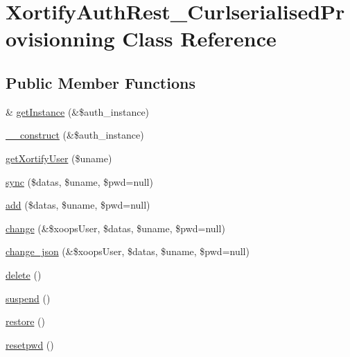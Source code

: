 \hypertarget{class_xortify_auth_rest___curlserialised_provisionning}{\section{Xortify\-Auth\-Rest\-\_\-\-Curlserialised\-Provisionning Class Reference}
\label{class_xortify_auth_rest___curlserialised_provisionning}
}
\subsection*{Public Member Functions}
\begin{DoxyCompactItemize}
\item 
\& \hyperlink{class_xortify_auth_rest___curlserialised_provisionning_a2c8eaa915c70d75289ac8a03686194f9}{get\-Instance} (\&\$auth\-\_\-instance)
\item 
\hyperlink{class_xortify_auth_rest___curlserialised_provisionning_a0f25832dc86774e7605b81fe57b083c2}{\-\_\-\-\_\-construct} (\&\$auth\-\_\-instance)
\item 
\hyperlink{class_xortify_auth_rest___curlserialised_provisionning_a041d726ac26672547ed1504e8e0117aa}{get\-Xortify\-User} (\$uname)
\item 
\hyperlink{class_xortify_auth_rest___curlserialised_provisionning_a35dc08b0f2138eb818ff95345b73bcff}{sync} (\$datas, \$uname, \$pwd=null)
\item 
\hyperlink{class_xortify_auth_rest___curlserialised_provisionning_adfc9fcef01e7bd7b2f47e8e79d51fc63}{add} (\$datas, \$uname, \$pwd=null)
\item 
\hyperlink{class_xortify_auth_rest___curlserialised_provisionning_ae1f0971b9712c794620cf309164e43af}{change} (\&\$xoops\-User, \$datas, \$uname, \$pwd=null)
\item 
\hyperlink{class_xortify_auth_rest___curlserialised_provisionning_a94f4e0408f26e65abca347ec883f4ec9}{change\-\_\-json} (\&\$xoops\-User, \$datas, \$uname, \$pwd=null)
\item 
\hyperlink{class_xortify_auth_rest___curlserialised_provisionning_a13bdffdd926f26b825ea57066334ff01}{delete} ()
\item 
\hyperlink{class_xortify_auth_rest___curlserialised_provisionning_ad73006a505121228f3b075c2409787d2}{suspend} ()
\item 
\hyperlink{class_xortify_auth_rest___curlserialised_provisionning_aa1371f22826cf8cde4454c9b467203d0}{restore} ()
\item 
\hyperlink{class_xortify_auth_rest___curlserialised_provisionning_a06d70fbd3a2db390b6f2530c0076628e}{resetpwd} ()
\end{DoxyCompactItemize}
